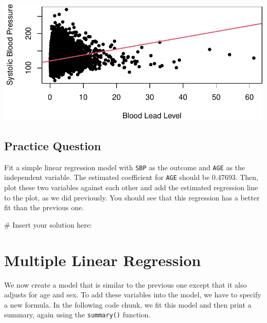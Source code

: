 \documentclass[
  letterpaper,
]{latex/krantz}
\makeatletter
\newenvironment{Shaded}{\begin{snugshade}}{\end{snugshade}}
\newcommand{\CommentTok}[1]{\textcolor[rgb]{0.37,0.37,0.37}{#1}}
\newenvironment{kframe}{%
\medskip{}
\setlength{\fboxsep}{.8em}
 \def\at@end@of@kframe{}%
 \ifinner\ifhmode%
  \def\at@end@of@kframe{\end{minipage}}%
  \begin{minipage}{\columnwidth}%
 \fi\fi%
 \def\FrameCommand##1{\hskip\@totalleftmargin \hskip-\fboxsep
 \colorbox{shadecolor}{##1}\hskip-\fboxsep
     \hskip-\linewidth \hskip-\@totalleftmargin \hskip\columnwidth}%
 \MakeFramed {\advance\hsize-\width
   \@totalleftmargin\z@ \linewidth\hsize
   \@setminipage}}%
 {\par\unskip\endMakeFramed%
 \at@end@of@kframe}
\renewenvironment{Shaded}{\begin{kframe}}{\end{kframe}}
\makeatother
\begin{document}
\begin{center}
\includegraphics[width=1\textwidth,height=\textheight]{book/linear_regression_files/figure-pdf/unnamed-chunk-6-1.pdf}
\end{center}

\subsection{Practice Question}\label{practice-question-20}

Fit a simple linear regression model with \texttt{SBP} as the outcome
and \texttt{AGE} as the independent variable. The estimated coefficient
for \texttt{AGE} should be 0.47693. Then, plot these two variables
against each other and add the estimated regression line to the plot, as
we did previously. You should see that this regression has a better fit
than the previous one.

\begin{Shaded}
\begin{Highlighting}[]
\CommentTok{\# Insert your solution here:}
\end{Highlighting}
\end{Shaded}

\section{\texorpdfstring{Multiple Linear Regression
}{Multiple Linear Regression }}\label{multiple-linear-regression}

We now create a model that is similar to the previous one except that it
also adjusts for age and sex. To add these variables into the model, we
have to specify a new formula. In the following code chunk, we fit this
model and then print a summary, again using the \texttt{summary()}
function.
\end{document}
